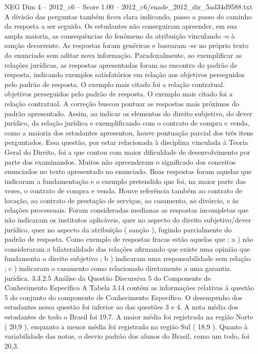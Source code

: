 \begin{textsample}{NEG Dim 4 – 2012\_c6 – Score 1.00 – 2012\_c6/enade\_2012\_dir\_5ad34d9588.txt}
A divisão das perguntas também ficou clara indicando, passo a passo do caminho da resposta a ser seguido.
Os estudantes não conseguiram apreender, em sua ampla maioria, as consequências do fenômeno da atribuição vinculando -o à sanção decorrente.
As respostas foram genéricas e basearam -se no próprio texto do enunciado sem aditar nova informação.
Paradoxalmente, ao exemplificar as relações jurídicas, as respostas apresentadas foram ao encontro do padrão de resposta, indicando exemplos satisfatórios em relação aos objetivos perseguidos pelo padrão de resposta.
O exemplo mais citado foi a relação contratual. objetivos perseguidos pelo padrão de resposta.
O exemplo mais citado foi a relação contratual.
A correção buscou pontuar as respostas mais próximas do padrão apresentado.
Assim, ao indicar os elementos do direito subjetivo, do dever jurídico, da relação jurídica e exemplificando com o contrato de compra e venda, como a maioria dos estudantes apresentou, houve pontuação parcial dos três itens perguntados.
Essa questão, por estar relacionada à disciplina vinculada à Teoria Geral do Direito, foi a que contou com maior dificuldade de desenvolvimento por parte dos examinandos.
Muitos não apreenderam o significado dos conceitos enunciados no texto apresentado no enunciado.
Boas respostas foram aquelas que indicaram a fundamentação e o exemplo pretendido que foi, na maior parte das vezes, o contrato de compra e venda.
Houve referência também ao contrato de locação, ao contrato de prestação de serviços, ao casamento, ao divórcio, e às relações processuais.
Foram consideradas medianas as respostas incompletas que não indicaram os institutos aplicáveis, quer no aspecto do direito subjetivo/dever jurídico, quer no aspecto da atribuição ( sanção ), fugindo parcialmente do padrão de resposta.
Como exemplo de respostas fracas estão aquelas que : a ) não consideraram a bilateralidade das relações afirmando que existe uma opinião que fundamenta o direito subjetivo ; b ) indicaram uma responsabilidade sem relação ; c ) indicaram o casamento como relacionado diretamente a uma garantia jurídica. 3.3.2.5 Análise da Questão Discursiva 5 do Componente de Conhecimento Específico A Tabela 3.14 contém as informações relativas à questão 5 do conjunto do componente de Conhecimento Específico.
O desempenho dos estudantes nessa questão foi inferior ao das questões 3 e 4.
A nota média dos estudantes de todo o Brasil foi 19,7.
A maior média foi registrada na região Norte ( 20,9 ), enquanto a menor média foi registrada na região Sul ( 18,9 ).
Quanto à variabilidade das notas, o desvio padrão dos alunos do Brasil, como um todo, foi 20,3.

\end{textsample}
